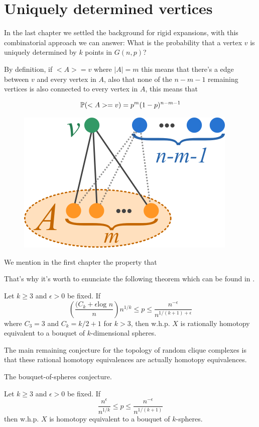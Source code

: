 \section{Uniquely determined vertices}

In the last chapter we settled the background for rigid expansions, with this combinatorial approach we can answer: What is the probability that a vertex $v$ is uniquely determined by $k$ points in $G(n,p)$?

By definition, if $<A> = v$ where $|A| = m$  this means that there's a edge between $v$ and every vertex in $A$, also that none of the $n-m-1$ remaining vertices is also connected to every vertex in $A$, this means that

$$\P(<A> = v) = p^{m}(1-p)^{n-m-1}$$

\begin{figure}[h!]
	\centering
	\includegraphics[scale=1]{Figures/uni.png}
\end{figure}

We mention in the first chapter the property that 


That's why it's worth to enunciate the following theorem which can be found in \cite[Khale, 16]{Khale}.
\begin{theorem}
Let $k \geq 3$ and $\epsilon > 0$ be fixed. If
$$\left(\frac{(C_{k} + \epsilon \text{log } n} {n} \right) n^{1/k} \leq p \leq \frac{n^{-\epsilon}}{n^{1/(k+1)+\epsilon}}$$
where $C_{3} = 3$ and $C_{k} = k/2 + 1$ for $k > 3$, then w.h.p. $X$ is rationally homotopy
equivalent to a bouquet of $k$-dimensional spheres.
\end{theorem}

The main remaining conjecture for the topology of random clique complexes is that these rational homotopy equivalences are actually homotopy equivalences.

\begin{conjecture}
The bouquet-of-spheres conjecture.

Let $k \geq 3$ and $\epsilon > 0$ be fixed. If
$$\frac{n^{\epsilon}}{n^{1/k}} \leq p \leq \frac{n^{-\epsilon}}{n^{1/(k+1)}}$$
then w.h.p. $X$ is homotopy equivalent to a bouquet of $k$-spheres.
\end{conjecture}